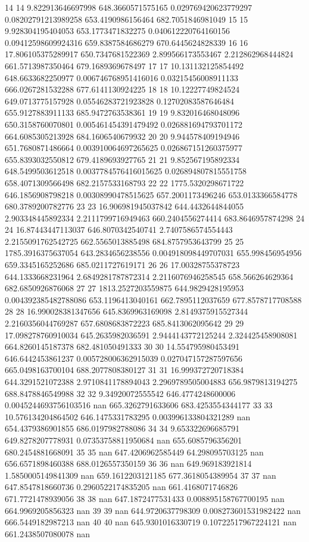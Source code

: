 {14 14 9.822913646697998 648.3660571575165 0.029769420623779297 0.08202791213989258 653.4190986156464 682.7051846981049
15 15 9.928304195404053 653.1773471832275 0.040612220764160156 0.09412598609924316 659.8387584686279 670.6445624828339
16 16 17.806105375289917 650.7347681522369 2.899566173553467 2.212862968444824 661.5713987350464 679.1689369678497
17 17 10.131132125854492 648.6633682250977 0.006746768951416016 0.03215456008911133 666.0267281532288 677.6141130924225
18 18 10.12227749824524 649.0713775157928 0.05546283721923828 0.12702083587646484 655.9127883911133 685.9472763538361
19 19 9.832016468048096 650.3158760070801 0.005461454391479492 0.026881694793701172 664.6085305213928 684.1606540679932
20 20 9.944578409194946 651.7680871486664 0.003910064697265625 0.026867151260375977 655.8393032550812 679.4189693927765
21 21 9.852567195892334 648.5499503612518 0.0037784576416015625 0.026894807815551758 658.4071309566498 682.2157533168793
22 22 1775.5320298671722 646.1856908798218 0.00308990478515625 657.2001173496246 653.0133366584778 680.3789200782776
23 23 16.906981945037842 644.4432644844055 2.903348445892334 2.2111799716949463 660.2404556274414 683.8646957874298
24 24 16.87443447113037 646.8070342540741 2.7407586574554443 2.2155091762542725 662.5565013885498 684.8757953643799
25 25 1785.3916375637054 643.2834656238556 0.004918098449707031 655.998456954956 659.3345165252686 685.0211727619171
26 26 17.00328755378723 644.1333668231964 2.6849281787872314 2.2116076946258545 658.566264629364 682.6850926876068
27 27 1813.2527203559875 644.9829428195953 0.004392385482788086 653.1196413040161 662.7895112037659 677.8578717708588
28 28 16.990028381347656 645.8369963169098 2.8149375915527344 2.2160356044769287 657.6808683872223 685.8413062095642
29 29 17.098278760910034 645.2635982036591 2.9444143772125244 2.324425458908081 664.8260145187378 682.481050491333
30 30 14.554795980453491 646.6442453861237 0.005728006362915039 0.027047157287597656 665.0498163700104 688.2077808380127
31 31 16.999372720718384 644.3291521072388 2.9710841178894043 2.2969789505004883 656.9879813194275 688.8478846549988
32 32 9.34920072555542 646.4774248600006 0.0045244693756103516 nan 665.3262791633606 683.4253554344177
33 33 10.576134204864502 646.1475331783295 0.003996133804321289 nan 654.4379386901855 686.0197982788086
34 34 9.653322696685791 649.8278207778931 0.07353758811950684 nan 655.6085796356201 680.2454881668091
35 35 nan 647.4206962585449 64.298095703125 nan 656.6571898460388 688.0126557350159
36 36 nan 649.969183921814 1.5850005149841309 nan 659.1612203121185 677.3618054389954
37 37 nan 647.8547818660736 0.2960522174835205 nan 661.4168071746826 671.7721478939056
38 38 nan 647.1872477531433 0.008895158767700195 nan 664.9969205856323 nan
39 39 nan 644.9720637798309 0.008273601531982422 nan 666.5449182987213 nan
40 40 nan 645.9301016330719 0.10722517967224121 nan 661.2438507080078 nan
}\tableexpiploadecomsmph
